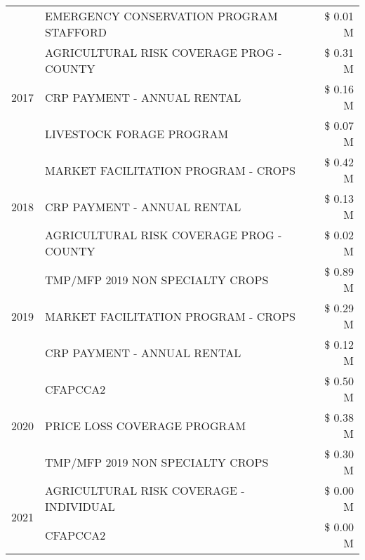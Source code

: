 \begin{tabular}{llr}
 & EMERGENCY CONSERVATION PROGRAM STAFFORD & \$ 0.01 M \\
\cline{1-3}
\multirow[t]{3}{*}{2017} & AGRICULTURAL RISK COVERAGE PROG - COUNTY & \$ 0.31 M \\
 & CRP PAYMENT - ANNUAL RENTAL & \$ 0.16 M \\
 & LIVESTOCK FORAGE PROGRAM & \$ 0.07 M \\
\cline{1-3}
\multirow[t]{3}{*}{2018} & MARKET FACILITATION PROGRAM - CROPS & \$ 0.42 M \\
 & CRP PAYMENT - ANNUAL RENTAL & \$ 0.13 M \\
 & AGRICULTURAL RISK COVERAGE PROG - COUNTY & \$ 0.02 M \\
\cline{1-3}
\multirow[t]{3}{*}{2019} & TMP/MFP 2019 NON SPECIALTY CROPS & \$ 0.89 M \\
 & MARKET FACILITATION PROGRAM - CROPS & \$ 0.29 M \\
 & CRP PAYMENT - ANNUAL RENTAL & \$ 0.12 M \\
\cline{1-3}
\multirow[t]{3}{*}{2020} & CFAPCCA2 & \$ 0.50 M \\
 & PRICE LOSS COVERAGE PROGRAM & \$ 0.38 M \\
 & TMP/MFP 2019 NON SPECIALTY CROPS & \$ 0.30 M \\
\cline{1-3}
\multirow[t]{2}{*}{2021} & AGRICULTURAL RISK COVERAGE - INDIVIDUAL & \$ 0.00 M \\
 & CFAPCCA2 & \$ 0.00 M \\
\cline{1-3}
\bottomrule
\end{tabular}
